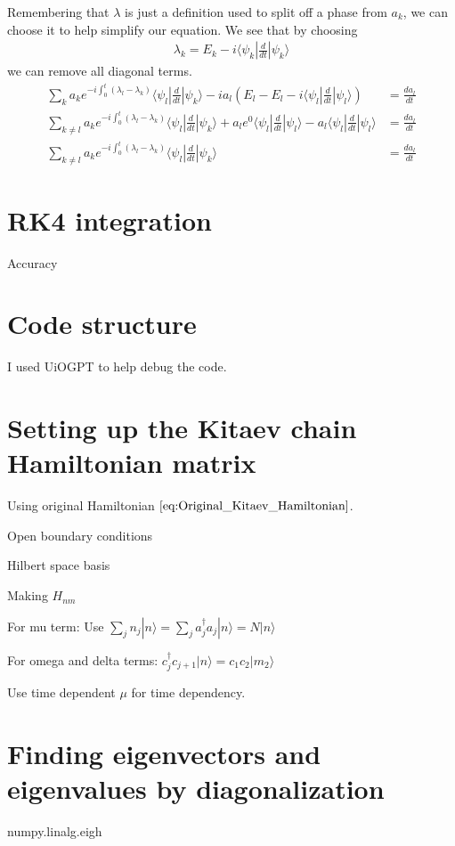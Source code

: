 Remembering that $\lambda$ is just a definition used to split off a phase from $a_k$, we can choose it to help simplify our equation. We see that by choosing
\begin{align}
    \lambda_k = E_k - i \langle \psi_k | \frac{d}{dt} |\psi_k\rangle
\end{align}
we can remove all diagonal terms.
\begin{align}
    \sum_k a_k e^{-i\int_0^t (\lambda_l - \lambda_k)} \langle \psi_l | \frac{d}{dt} |\psi_k\rangle -i a_l(E_l - E_l - i \langle \psi_l | \frac{d}{dt} |\psi_l\rangle) &= \frac{d a_l}{dt} \\
    \sum_{k\neq l} a_k e^{-i\int_0^t (\lambda_l - \lambda_k)} \langle \psi_l | \frac{d}{dt} |\psi_k\rangle  +  a_l e^{0} \langle \psi_l | \frac{d}{dt} |\psi_l\rangle  - a_l \langle \psi_l | \frac{d}{dt} |\psi_l\rangle &= \frac{d a_l}{dt} \\
    \sum_{k\neq l} a_k e^{-i\int_0^t (\lambda_l - \lambda_k)} \langle \psi_l | \frac{d}{dt} |\psi_k\rangle &= \frac{d a_l}{dt}     
\end{align}

\section{RK4 integration}
Accuracy



\section{Code structure}
I used UiOGPT to help debug the code.

\section{Setting up the Kitaev chain Hamiltonian matrix}
Using original Hamiltonian $\ref{eq:Original_Kitaev_Hamiltonian}$.

Open boundary conditions

Hilbert space basis

Making $H_{nm}$

For mu term:
Use $ \sum_j n_j |n\rangle = \sum_j a_j^\dagger a_j |n\rangle = N|n\rangle$

For omega and delta terms:
$c_j^\dagger c_{j+1} |n\rangle = c_1 c_2 |m_2\rangle$

Use time dependent $\mu$ for time dependency. 

\section{Finding eigenvectors and eigenvalues by diagonalization}
numpy.linalg.eigh

